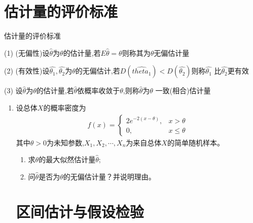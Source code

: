 \documentclass[12pt, a4paper, oneside, UTF8]{ctexbook}
\begin{document}
\section{估计量的评价标准}
\begin{remark}
    估计量的评价标准
    \item[(1)] (无偏性)设$\hat{\theta}$为$\theta$的估计量,若$E\hat{\theta}=\theta$则称其为$\theta$无偏估计量
    \item[(2)] (有效性)设$\hat{\theta_1},\hat{\theta_2}$为$\theta$的无偏估计,若$D(\hat{theta_1})<D(\hat{\theta_2})$则称$\hat{\theta_1}$
    比$\hat{\theta_2}$更有效 
    \item[(3)] 设$\hat{\theta}$为$\theta$的估计量,若$\hat{\theta}$依概率收敛于$\theta$,则称$\hat{\theta}$为$\theta$
    一致(相合)估计量
\end{remark}
\begin{enumerate}[label=\arabic*.,start=4]
    \item 设总体$X$的概率密度为
    \begin{align*}
        f(x)=\begin{cases}
            2e^{-2(x-\theta)}, & x>\theta \\
            0, & x\leq\theta
        \end{cases}
    \end{align*}
    其中$\theta>0$为未知参数,$X_1,X_2,\cdots,X_n$为来自总体$X$的简单随机样本。
    \begin{enumerate}
        \item 求$\theta$的最大似然估计量$\hat{\theta}$;
        \item 问$\hat{\theta}$是否为$\theta$的无偏估计量？并说明理由。
    \end{enumerate}
    
    \begin{solution}
    \newpage
    \end{solution}
\section{区间估计与假设检验}
\end{enumerate}
\ifx\allfiles\undefined
\end{document}

